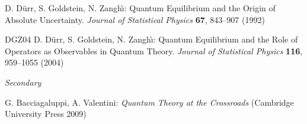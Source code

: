 \documentclass[12pt]{report}
\begin{document}
\begin{thebibliography}{100}



  D. D\"urr, S. Goldstein, N. Zangh\`\i:
  Quantum Equilibrium and the Origin of Absolute Uncertainty. 
  \textit{Journal of Statistical Physics} \textbf{67}, 843--907 (1992) 

\bibitem%
{DGZ04}
  D. D\"urr, S. Goldstein, N. Zangh\`\i: Quantum
  Equilibrium and the Role of Operators as Observables in Quantum 
  Theory. \textit{Journal of Statistical Physics} \textbf{116}, 959--1055 (2004)






\item[\textit{Secondary}]



 G. Bacciagaluppi, A. Valentini: 
  \textit{Quantum Theory at the Crossroads} (Cambridge 
  University Press 2009)




\end{thebibliography}
\end{document}
